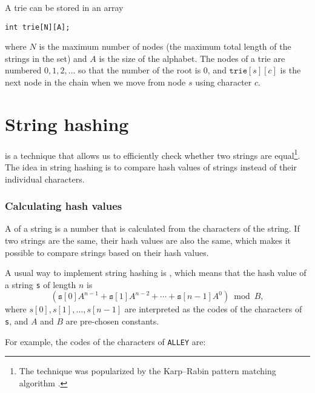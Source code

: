 A trie can be stored in an array
\begin{lstlisting}
int trie[N][A];
\end{lstlisting}
where $N$ is the maximum number of nodes
(the maximum total length of the strings in the set)
and $A$ is the size of the alphabet.
The nodes of a trie are numbered
$0,1,2,\ldots$ so that the number of the root is 0,
and $\texttt{trie}[s][c]$ is the next node in the chain
when we move from node $s$ using character $c$.

\section{String hashing}


 is a technique that
allows us to efficiently check whether two
strings are equal\footnote{The technique
was popularized by the Karp–Rabin pattern matching
algorithm \cite{kar87}.}.
The idea in string hashing is to compare hash values of
strings instead of their individual characters.

\subsubsection*{Calculating hash values}


A  of a string is
a number that is calculated from the characters
of the string.
If two strings are the same,
their hash values are also the same,
which makes it possible to compare strings
based on their hash values.

A usual way to implement string hashing
is , which means
that the hash value of a string \texttt{s}
of length $n$ is
\[(\texttt{s}[0] A^{n-1} + \texttt{s}[1] A^{n-2} + \cdots + \texttt{s}[n-1] A^0) \bmod B  ,\]
where $s[0],s[1],\ldots,s[n-1]$
are interpreted as the codes of the characters of \texttt{s},
and $A$ and $B$ are pre-chosen constants.

For example, the codes of the characters
of \texttt{ALLEY} are:
\begin{center}
\end{center}


